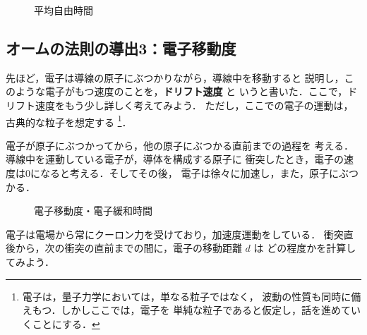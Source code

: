                         \begin{figure}[hbt]
                            \begin{center}
                                \label{fig:hjj}
                                \caption{平均自由時間}
                            \end{center}
                        \end{figure}

        \subsection{オームの法則の導出3：電子移動度}
            先ほど，電子は導線の原子にぶつかりながら，導線中を移動すると
            説明し，このような電子がもつ速度のことを，\textbf{ドリフト速度} と
            いうと書いた．ここで，ドリフト速度をもう少し詳しく考えてみよう．
            ただし，ここでの電子の運動は，古典的な粒子を想定する
                \footnote{
                    電子は，量子力学においては，単なる粒子ではなく，
                    波動の性質も同時に備えもつ．しかしここでは，電子を
                    単純な粒子であると仮定し，話を進めていくことにする．
                }．

            電子が原子にぶつかってから，他の原子にぶつかる直前までの過程を
            考える．導線中を運動している電子が，導体を構成する原子に
            衝突したとき，電子の速度は0になると考える．そしてその後，
            電子は徐々に加速し，また，原子にぶつかる．
                    \begin{figure}[hbt]
                        \begin{center}
                            \label{fig:drift_sokudo}
                            \caption{電子移動度・電子緩和時間}
                        \end{center}
                    \end{figure}

            電子は電場から常にクーロン力を受けており，加速度運動をしている．
            衝突直後から，次の衝突の直前までの間に，電子の移動距離 $d$ は
            どの程度かを計算してみよう．

